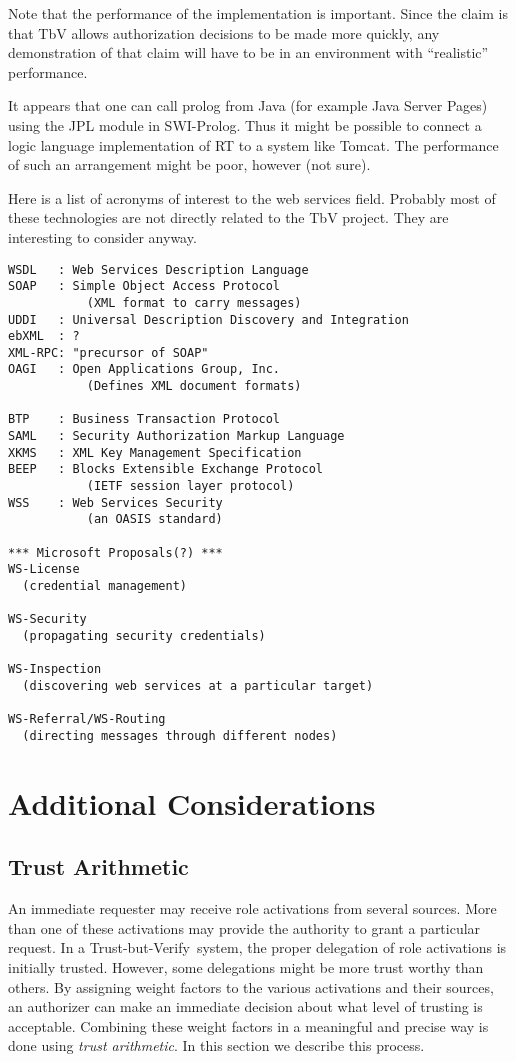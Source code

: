 \documentclass{article}
\newcommand{\TbV}{Trust-but-Verify}
\newcommand{\newterm}[1]{\textit{#1}}
\begin{document}
Note that the performance of the implementation is important. Since the claim is that TbV allows
authorization decisions to be made more quickly, any demonstration of that claim will have to be
in an environment with ``realistic'' performance.

It appears that one can call prolog from Java (for example Java Server Pages) using the JPL
module in SWI-Prolog. Thus it might be possible to connect a logic language implementation of RT
to a system like Tomcat. The performance of such an arrangement might be poor, however (not
sure).

Here is a list of acronyms of interest to the web services field. Probably most of these
technologies are not directly related to the TbV project. They are interesting to consider
anyway.

\begin{verbatim}
WSDL   : Web Services Description Language
SOAP   : Simple Object Access Protocol
           (XML format to carry messages)
UDDI   : Universal Description Discovery and Integration
ebXML  : ?
XML-RPC: "precursor of SOAP"
OAGI   : Open Applications Group, Inc.
           (Defines XML document formats)

BTP    : Business Transaction Protocol
SAML   : Security Authorization Markup Language
XKMS   : XML Key Management Specification
BEEP   : Blocks Extensible Exchange Protocol
           (IETF session layer protocol)
WSS    : Web Services Security
           (an OASIS standard)

*** Microsoft Proposals(?) ***
WS-License
  (credential management)
  
WS-Security
  (propagating security credentials)
  
WS-Inspection
  (discovering web services at a particular target)
  
WS-Referral/WS-Routing
  (directing messages through different nodes)
\end{verbatim}


\section{Additional Considerations}
\label{sec:additional}

\subsection{Trust Arithmetic}

An immediate requester may receive role activations from several sources. More than one of these
activations may provide the authority to grant a particular request. In a \TbV\ system, the
proper delegation of role activations is initially trusted. However, some delegations might be
more trust worthy than others. By assigning weight factors to the various activations and their
sources, an authorizer can make an immediate decision about what level of trusting is
acceptable. Combining these weight factors in a meaningful and precise way is done using
\newterm{trust arithmetic}. In this section we describe this process.
\end{document}
